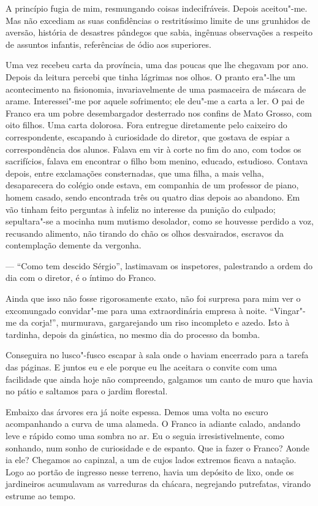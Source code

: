 A princípio fugia de mim, resmungando coisas
indecifráveis. Depois aceitou"-me. Mas não excediam as suas
confidências o restritíssimo limite de uns grunhidos de aversão,
história de desastres pândegos que sabia, ingênuas observações a
respeito de assuntos infantis, referências de ódio aos superiores. 

Uma vez recebeu carta da província, uma das poucas que lhe chegavam por
ano. Depois da leitura percebi que tinha lágrimas nos olhos. O pranto
era"-lhe um acontecimento na fisionomia, invariavelmente de uma
pasmaceira de máscara de arame. Interessei"-me por aquele sofrimento;
ele deu"-me a carta a ler. O pai de Franco era um pobre desembargador
desterrado nos confins de Mato Grosso, com oito filhos. Uma carta
dolorosa. Fora entregue diretamente pelo caixeiro do correspondente,
escapando à curiosidade do diretor, que gostava de espiar a
correspondência dos alunos. Falava em vir à corte no fim do ano, com
todos os sacrifícios, falava em encontrar o filho bom menino, educado,
estudioso. Contava depois, entre exclamações consternadas, que uma
filha, a mais velha, desaparecera do colégio onde estava, em companhia
de um professor de piano, homem casado, sendo encontrada três ou quatro
dias depois ao abandono. Em vão tinham feito perguntas à infeliz no
interesse da punição do culpado; sepultara"-se a mocinha num mutismo
desolador, como se houvesse perdido a voz, recusando alimento, não
tirando do chão os olhos desvairados, escravos da contemplação demente da vergonha. 

--- ``Como tem descido Sérgio'', lastimavam os inspetores, 
palestrando a ordem do dia com o diretor, é o íntimo do Franco. 

Ainda que isso não fosse rigorosamente exato, não foi
surpresa para mim ver o excomungado convidar"-me para uma
extraordinária empresa à noite. ``Vingar"-me da corja!'', murmurava,
gargarejando um riso incompleto e azedo. Isto à tardinha, depois da
ginástica, no mesmo dia do processo da bomba. 

Conseguira no lusco"-fusco escapar à sala onde o haviam encerrado para a 
tarefa das páginas. E juntos eu e ele porque eu lhe aceitara o convite com uma
facilidade que ainda hoje não compreendo, galgamos um canto de muro que
havia no pátio e saltamos para o jardim florestal. 

Embaixo das árvores
era já noite espessa. Demos uma volta no escuro acompanhando a curva de
uma alameda. O Franco ia adiante calado, andando leve e rápido como uma
sombra no ar. Eu o seguia irresistivelmente, como sonhando, num sonho
de curiosidade e de espanto. Que ia fazer o Franco? Aonde ia ele?
Chegamos ao capinzal, a um de cujos lados extremos ficava a natação.
Logo ao portão de ingresso nesse terreno, havia um depósito de lixo,
onde os jardineiros acumulavam as varreduras da chácara, negrejando
putrefatas, virando estrume ao tempo. 

